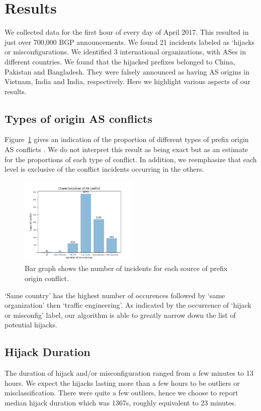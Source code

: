  \section{Results}\label{sec:results}
We collected data for the first hour of every day of April 2017. This resulted in just over 700,000 BGP announcements. We found 21 incidents labeled as  `hijacks or misconfigurations. We identified 3 international organizations, with ASes in different countries. We found that the hijacked prefixes belonged to China, Pakistan and Bangladesh. They were falsely announced as having AS origins in Vietnam, India and India, respectively.
Here we highlight various aspects of our results. 
\subsection{Types of origin AS conflicts}
Figure~\ref{fig:conflict_source} gives an indication of the proportion of different types of prefix origin AS conflicts . We do not interpret this result as being exact but as an estimate for the proportions of each type of conflict. In addition, we reemphasize that each level is exclusive of the conflict incidents occurring in the others.
 \begin{figure}
	\includegraphics[width=0.5\textwidth]{AS_Origin_Conflict_Types.png}
	\caption{Bar graph shows the number of incidents for each source of prefix origin conflict.}
	\label{fig:conflict_source}
\end{figure}
`Same country' has the highest number of occurences followed by `same organization' then `traffic engineering'. As indicated by the occurrence of `hijack or misconfig' label, our algorithm is able to greatly narrow down the list of potential hijacks. 
\subsection{Hijack Duration}
The duration of hijack and/or misconfiguration ranged from a few minutes to 13 hours. We expect the hijacks lasting more than a few hours to be outliers or misclassification. There were quite a few outliers, hence we choose to report median hijack duration which was 1367s, roughly equivalent to 23 minutes. 
